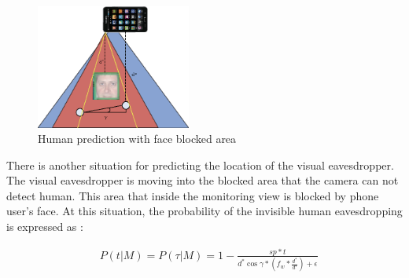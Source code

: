 
\begin{figure}[H]
\centering
\includegraphics[width=2in]{areaMotionBlocked.eps}
\caption{ Human prediction with face blocked area}
\label{fig:invisible}
\end{figure}
There is another situation for predicting the location of the visual eavesdropper. The visual eavesdropper is moving into the blocked area that the camera can not detect human. This area that inside the monitoring view is blocked by phone user's face. At this situation, the probability of the invisible
human eavesdropping is expressed as :

\begin{equation}
\begin{split}
& P(t|M)=P(\tau|M)=1-\frac{sp*t}{d^*\cos\gamma*(f_w*\frac{d^*}{d'})+\epsilon}
\end{split}
\label{eqn:prob}
\end{equation}



